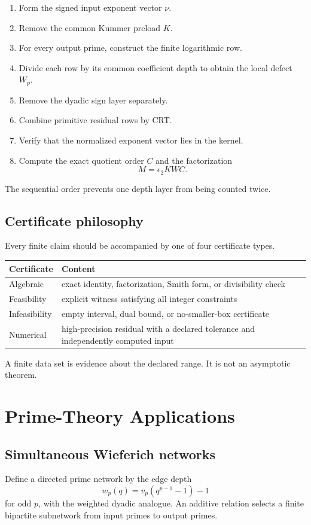 \begin{enumerate}[leftmargin=1.5em]
\item Form the signed input exponent vector $\nu$.
\item Remove the common Kummer preload $K$.
\item For every output prime, construct the finite logarithmic row.
\item Divide each row by its common coefficient depth to obtain the local defect $W_p$.
\item Remove the dyadic sign layer separately.
\item Combine primitive residual rows by CRT.
\item Verify that the normalized exponent vector lies in the kernel.
\item Compute the exact quotient order $C$ and the factorization
\[
 M=\epsilon_2KWC.
\]
\end{enumerate}

The sequential order prevents one depth layer from being counted twice.

\section{Certificate philosophy}
Every finite claim should be accompanied by one of four certificate types.

\begin{longtable}{p{}p{}}
\toprule
Certificate & Content\\
\midrule
Algebraic & exact identity, factorization, Smith form, or divisibility check\\
Feasibility & explicit witness satisfying all integer constraints\\
Infeasibility & empty interval, dual bound, or no-smaller-box certificate\\
Numerical & high-precision residual with a declared tolerance and independently computed input\\
\bottomrule
\end{longtable}

A finite data set is evidence about the declared range. It is not an asymptotic theorem.

\chapter{Prime-Theory Applications}

\section{Simultaneous Wieferich networks}
Define a directed prime network by the edge depth
\[
 w_p(q)=v_p(q^{p-1}-1)-1
\]
for odd $p$, with the weighted dyadic analogue. An additive relation selects a finite bipartite subnetwork from input primes to output primes.

